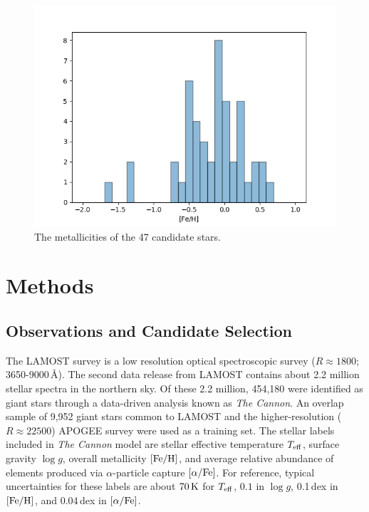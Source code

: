 \documentclass[a4paper,fleqn,usenatbib]{mnras}
\begin{document}
	\begin{figure}
		\includegraphics[width=\columnwidth]{metalhistpython}
		\caption{The metallicities of the 47 candidate stars.}
		\label{fig:metallicity}
	\end{figure}
	
	\section{Methods}
	
	\subsection{Observations and Candidate Selection}
	
	The LAMOST survey is a low resolution optical spectroscopic survey ($R\approx1800$; 3650-9000\,\AA). The second data release from LAMOST \citep{lamost} contains about 2.2 million stellar spectra in the northern sky. Of these 2.2 million, 454,180 were identified as giant stars through a data-driven analysis known as \textit{The Cannon}. An overlap sample of 9,952 giant stars common to LAMOST and the higher-resolution ($R\approx22500$) APOGEE survey \citep{apogee} were used as a training set.
	The stellar labels included in \textit{The Cannon} model are stellar effective temperature $T_{\rm{eff}}$, surface gravity $\log{g}$, overall metallicity $\rm{[Fe/H]}$, and average relative abundance of elements produced via $\alpha$-particle capture $\rm{[\alpha/Fe]}$. For reference, typical uncertainties for these labels are about $70\,\rm{K}$ for $T_{\rm{eff}}$, $0.1$ in $\log{g}$, 0.1\,dex in $\rm{[Fe/H]}$, and 0.04\,dex in $\rm{[\alpha/Fe]}$.
	
\end{document}
